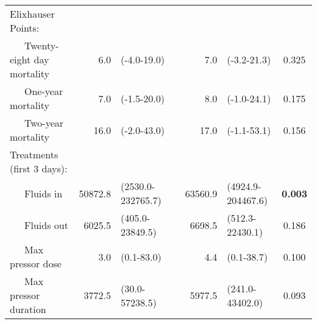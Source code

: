 {\begin{tabular}{l r l c r l c}
Elixhauser Points: & & & & & & \\ 
~~~Twenty-eight day mortality & 6.0 & (-4.0-19.0) & & 7.0 & (-3.2-21.3) & 0.325 \\ 
~~~One-year mortality & 7.0 & (-1.5-20.0) & & 8.0 & (-1.0-24.1) & 0.175 \\ 
~~~Two-year mortality & 16.0 & (-2.0-43.0) & & 17.0 & (-1.1-53.1) & 0.156 \\ 
Treatments (first 3 days): & & & & & & \\ 
~~~Fluids in & 50872.8 & (2530.0-232765.7) & & 63560.9 & (4924.9-204467.6) & \textbf{0.003} \\ 
~~~Fluids out & 6025.5 & (405.0-23849.5) & & 6698.5 & (512.3-22430.1) & 0.186 \\ 
~~~Max pressor dose & 3.0 & (0.1-83.0) & & 4.4 & (0.1-38.7) & 0.100 \\ 
~~~Max pressor duration & 3772.5 & (30.0-57238.5) & & 5977.5 & (241.0-43402.0) & 0.093 \\ 
\bottomrule
\end{tabular}
}
